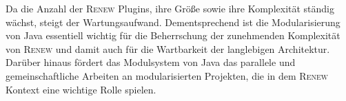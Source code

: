 Da die Anzahl der \textsc{Renew} Plugins, ihre Größe sowie ihre Komplexität ständig wächst, steigt der Wartungsaufwand. Dementsprechend ist die Modularisierung von Java essentiell wichtig für die Beherrschung der zunehmenden Komplexität von \textsc{Renew} und damit auch für die Wartbarkeit der langlebigen Architektur.\newline
Darüber hinaus fördert das Modulsystem von Java das parallele und gemeinschaftliche Arbeiten an modularisierten Projekten, die in dem \textsc{Renew} Kontext eine wichtige Rolle spielen.\newline


\linespread{1.0}\selectfont


\tableofcontents %
\setcounter{lofdepth}{5}
\listoffigures
\blankpage





 
 

\blankpage
      
\begin{appendices}
\end{appendices}

\blankpage


